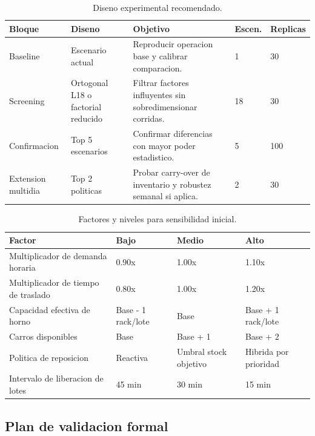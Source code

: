 \documentclass[12pt]{article}
\begin{document}
\begin{table}[H]
\centering
\caption{Diseno experimental recomendado.}
\begin{tabularx}{\textwidth}{L{2.5cm}L{3.2cm}Y C{1.6cm}C{1.6cm}}
\toprule
{}
\color{white}Bloque & \color{white}Diseno & \color{white}Objetivo & \color{white}Escen. & \color{white}Replicas \\
\midrule
Baseline & Escenario actual & Reproducir operacion base y calibrar comparacion. & 1 & 30 \\
Screening & Ortogonal L18 o factorial reducido & Filtrar factores influyentes sin sobredimensionar corridas. & 18 & 30 \\
Confirmacion & Top 5 escenarios & Confirmar diferencias con mayor poder estadistico. & 5 & 100 \\
Extension multidia & Top 2 politicas & Probar carry-over de inventario y robustez semanal si aplica. & 2 & 30 \\
\bottomrule
\end{tabularx}
\end{table}

\begin{table}[H]
\centering
\caption{Factores y niveles para sensibilidad inicial.}
\begin{tabularx}{\textwidth}{L{4.0cm}C{2.7cm}C{2.7cm}C{2.7cm}}
\toprule
{}
\color{white}Factor & \color{white}Bajo & \color{white}Medio & \color{white}Alto \\
\midrule
Multiplicador de demanda horaria & 0.90x & 1.00x & 1.10x \\
Multiplicador de tiempo de traslado & 0.80x & 1.00x & 1.20x \\
Capacidad efectiva de horno & Base - 1 rack/lote & Base & Base + 1 rack/lote \\
Carros disponibles & Base & Base + 1 & Base + 2 \\
Politica de reposicion & Reactiva & Umbral stock objetivo & Hibrida por prioridad \\
Intervalo de liberacion de lotes & 45 min & 30 min & 15 min \\
\bottomrule
\end{tabularx}
\end{table}

\subsection{Plan de validacion formal}
\end{document}

